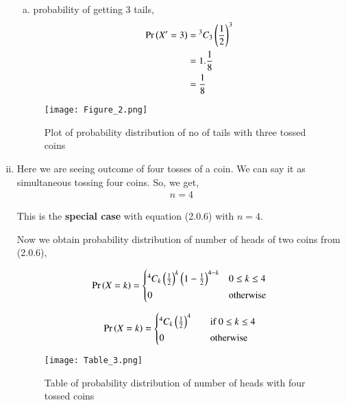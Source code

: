 \documentclass[journal,12pt,twocolumn]{IEEEtran}
\begin{document}
\begin{enumerate}[(i)]
\begin{enumerate}[(a)]
\item probability of getting 3 tails,
    \begin{align}
        \begin{split}
            \Pr\left(X'=3\right) &= {^3C_3}\left(\frac{1}{2}\right)^3\\
            &=1.\frac{1}{8}\\
            &=\frac{1}{8}
        \end{split}
    \end{align}
\end{enumerate}

\begin{figure}[h!]
    \centering
    \texttt{[image: Figure\_2.png]}
    \caption{Plot of probability distribution of no of tails with three tossed coins}
    \label{fig:Three coins}
\end{figure}



\item

Here we are seeing outcome of four tosses of a coin. We can say it as simultaneous tossing four coins. So, we get,
\begin{align}
    n=4
\end{align}

This is the \textbf{special case} with equation (2.0.6) with $n=4$.

Now we obtain probability distribution of number of heads of two coins from (2.0.6),

\begin{align*}
   \pr{X=k} =
  \begin{cases*}
    {^4 C_k}\left(\frac{1}{2}\right)^{k}\left(1-\frac{1}{2}\right)^{4-k} & $0 \leq k \leq 4$\\
    0 & otherwise
  \end{cases*}
\end{align*}

\begin{align}
   \pr{X=k} =
  \begin{cases*}
    {^4 C_k}\left(\frac{1}{2}\right)^{4} \quad& if $0 \leq k \leq 4$ \\
    0 \quad& otherwise
  \end{cases*}
\end{align}

\begin{figure}[h!]
    \centering
    \texttt{[image: Table\_3.png]}
    \caption{Table of probability distribution of number of heads with four tossed coins}
    \label{fig:Table_3}
\end{figure}


\end{enumerate}
\end{document}
